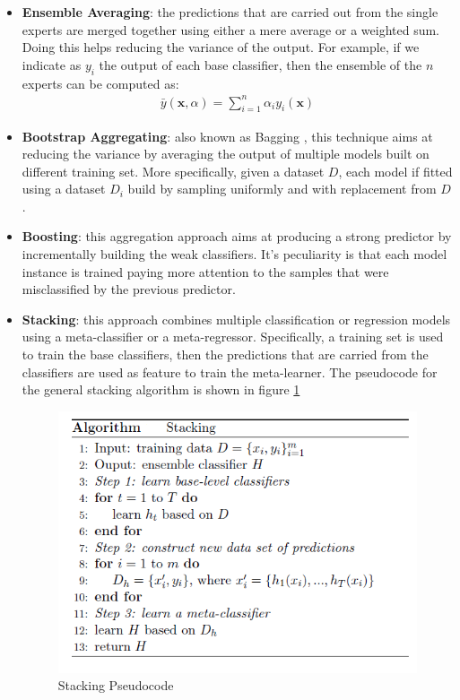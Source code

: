 \begin{itemize}
  \item \textbf{Ensemble Averaging}: the predictions that are carried out from the single experts are merged together using either a mere average or a weighted sum. Doing this helps reducing the variance of the output.
  For example, if we indicate as $y_{i}$ the output of each base classifier, then the ensemble of the $n$ experts can be computed as:
  \begin{equation}
  \label{eq:seventh_equation}
  \begin{gathered}
  \bar{y}(\mathbf{x},\alpha) = \sum_{i=1}^{n} \alpha_i y_{i}(\mathbf{x})
  \end{gathered}  
  \end{equation}
  \item \textbf{Bootstrap Aggregating}: also known as Bagging \cite{bagging}, this technique aims at reducing the variance by averaging the output of multiple models built on different training set. More specifically, given a dataset $D$, each model if fitted using a dataset $D_{i}$ build by sampling uniformly and with replacement from $D$.
  
  \item \textbf{Boosting}: this aggregation approach aims at producing a strong predictor by incrementally building the weak classifiers. It's peculiarity is that each model instance is trained paying more attention to the samples that were misclassified by the previous predictor.
  
  
  \item \textbf{Stacking}: this approach combines multiple classification or regression models using a meta-classifier or a meta-regressor. Specifically, a training set is used to train the base classifiers, then the predictions that are carried from the classifiers are used as feature to train the meta-learner. The pseudocode for the general stacking algorithm is shown in figure \ref{fig:twelfth_figure}
  \begin{figure}[htbp!]
\centering
\includegraphics[scale=0.55]{Tesi/images/stacking_pseudocode.png}
\caption{Stacking Pseudocode}
\label{fig:twelfth_figure}
\end{figure}
  
    \end{itemize}



